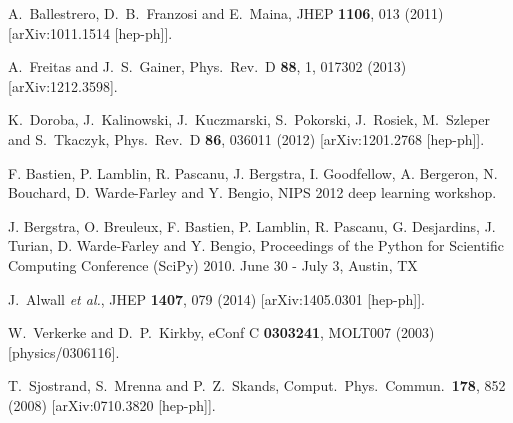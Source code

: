   A.~Ballestrero, D.~B.~Franzosi and E.~Maina,
  JHEP {\bf 1106}, 013 (2011)
  [arXiv:1011.1514 [hep-ph]].

  A.~Freitas and J.~S.~Gainer,
  Phys.\ Rev.\ D {\bf 88}, 1, 017302 (2013)
  [arXiv:1212.3598].

  K.~Doroba, J.~Kalinowski, J.~Kuczmarski, S.~Pokorski, J.~Rosiek, M.~Szleper and S.~Tkaczyk,
  Phys.\ Rev.\ D {\bf 86}, 036011 (2012)
  [arXiv:1201.2768 [hep-ph]].

F. Bastien, P. Lamblin, R. Pascanu, J. Bergstra, I. Goodfellow, A. Bergeron, N. Bouchard, D. Warde-Farley and Y. Bengio, NIPS 2012 deep learning workshop.

J. Bergstra, O. Breuleux, F. Bastien, P. Lamblin, R. Pascanu, G. Desjardins, J. Turian, D. Warde-Farley and Y. Bengio, Proceedings of the Python for Scientific Computing Conference (SciPy) 2010. June 30 - July 3, Austin, TX

  J.~Alwall {\it et al.},
  JHEP {\bf 1407}, 079 (2014)
  [arXiv:1405.0301 [hep-ph]].

  W.~Verkerke and D.~P.~Kirkby,
  eConf C {\bf 0303241}, MOLT007 (2003)
  [physics/0306116].

  T.~Sjostrand, S.~Mrenna and P.~Z.~Skands,
  Comput.\ Phys.\ Commun.\  {\bf 178}, 852 (2008)
  [arXiv:0710.3820 [hep-ph]].

